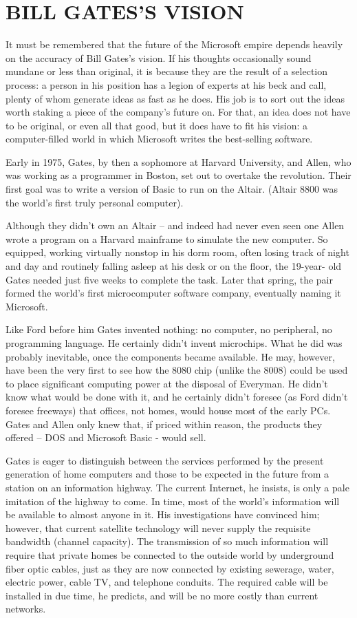 \documentclass[a5paper, 12pt, twoside]{extreport}
\begin{document}
\date{\today}
\section*{\normalsize BILL GATES'S VISION}
It must be remembered that the future of the Microsoft empire depends heavily on the accuracy of Bill Gates's vision. If his thoughts occasionally sound mundane or less than original, it is because they are the result of a selection process: a person in his position has a legion of experts at his beck and call, plenty of whom generate ideas as fast as he does. His job is to sort out the ideas worth staking a piece of the company's future on. For that, an idea does not have to be original, or even all that good, but it does have to fit his vision: a computer-filled world in which Microsoft writes the best-selling software.


Early in 1975, Gates, by then a sophomore at Harvard University, and Allen, who was working as a programmer in Boston, set out to overtake the revolution. Their first goal was to write a version of Basic to run on the Altair. (Altair 8800 was the world's first truly personal computer).


Although they didn't own an Altair -- and indeed had never even seen one Allen wrote a program on a Harvard mainframe to simulate the new computer. So equipped, working virtually nonstop in his dorm room, often losing track of night and day and routinely falling asleep at his desk or on the floor, the 19-year- old Gates needed just five weeks to complete the task. Later that spring, the pair formed the world's first microcomputer software company, eventually naming it Microsoft.


Like Ford before him Gates invented nothing: no computer, no peripheral, no programming language. He certainly didn't invent microchips. What he did was probably inevitable, once the components became available. He may, however, have been the very first to see how the 8080 chip (unlike the 8008) could be used to place significant computing power at the disposal of Everyman. He didn't know what would be done with it, and he certainly didn't foresee (as Ford didn't foresee freeways) that offices, not homes, would house most of the early PCs. Gates and Allen only knew that, if priced within reason, the products they offered -- DOS and Microsoft Basic - would sell.


Gates is eager to distinguish between the services performed by the present generation of home computers and those to be expected in the future from a station on an information highway. The current Internet, he insists, is only a pale imitation of the highway to come. In time, most of the world's information will be available to almost anyone in it. His investigations have convinced him; however, that current satellite technology will never supply the requisite bandwidth (channel capacity). The transmission of so much information will require that private homes be connected to the outside world by underground fiber optic cables, just as they are now connected by existing sewerage, water, electric power, cable TV, and telephone conduits. The required cable will be installed in due time, he predicts, and will be no more costly than current networks.
\end{document}

